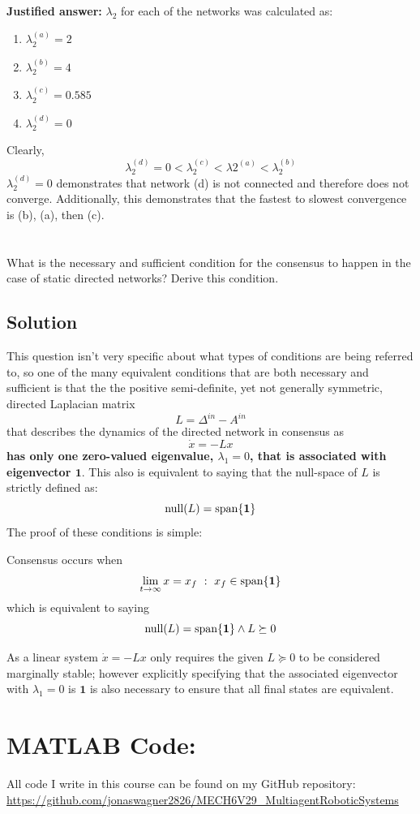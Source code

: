 \documentclass[]{article}
\numberwithin{equation}{section}
\newcommand{\st}{\ : \ }
\begin{document}
\textbf{Justified answer:} 
$\lambda_2$ for each of the networks was calculated as:
\begin{enumerate}
	\item $\lambda_{2}^{(a)} = 2$
	\item $\lambda_{2}^{(b)} = 4$
	\item $\lambda_{2}^{(c)} = 0.585$
	\item $\lambda_{2}^{(d)} = 0$
\end{enumerate}
Clearly, \[
	\lambda_{2}^{(d)} = 0 < \lambda_{2}^{(c)} < \lambda{2}^{(a)} < \lambda_{2}^{(b)}
\] 
$\lambda_{2}^{(d)} = 0$ demonstrates that network (d) is not connected and therefore does not converge.
Additionally, this demonstrates that the fastest to slowest convergence is (b), (a), then (c).

\section{}
What is the necessary and sufficient condition for the consensus to happen in the case of static directed networks? 
Derive this condition.

\subsection{Solution}
This question isn't very specific about what types of conditions are being referred to, so one of the many equivalent conditions that are both necessary and sufficient is that the the positive semi-definite, yet not generally symmetric, directed Laplacian matrix \[
	L = \Delta^{in} - A^{in}
\] that describes the dynamics of the directed network in consensus as\[
	\dot{x} = - L x
\]\textbf{ has only one zero-valued eigenvalue, $\lambda_1 = 0$, that is associated with eigenvector $\mathbf{1}$}.
This also is equivalent to saying that the null-space of $L$ is strictly defined as:\[
	\textnormal{null}\qty(L) = \textnormal{span}\qty{\mathbf{1}}
\] The proof of these conditions is simple:

Consensus occurs when\[
	\lim_{t \to \infty} x = x_f \st x_f \in \textnormal{span}\qty{\mathbf{1}}
\] which is equivalent to saying \[
	\textnormal{null}\qty(L) = \textnormal{span}\qty{\mathbf{1}} 
	\land L \succeq 0
\]

As a linear system $\dot{x} = -L x$ only requires the given $L \succeq 0$ to be considered marginally stable; however explicitly specifying that the associated eigenvector with $\lambda_1 = 0$ is $\mathbf{1}$ is also necessary to ensure that all final states are equivalent.

\newpage
\appendix
\section{MATLAB Code:}\label{apx:matlab}
All code I write in this course can be found on my GitHub repository:\\
\href{https://github.com/jonaswagner2826/MECH6V29_MultiagentRoboticSystems}{https://github.com/jonaswagner2826/MECH6V29\_MultiagentRoboticSystems}



\cite{*}
\end{document}
